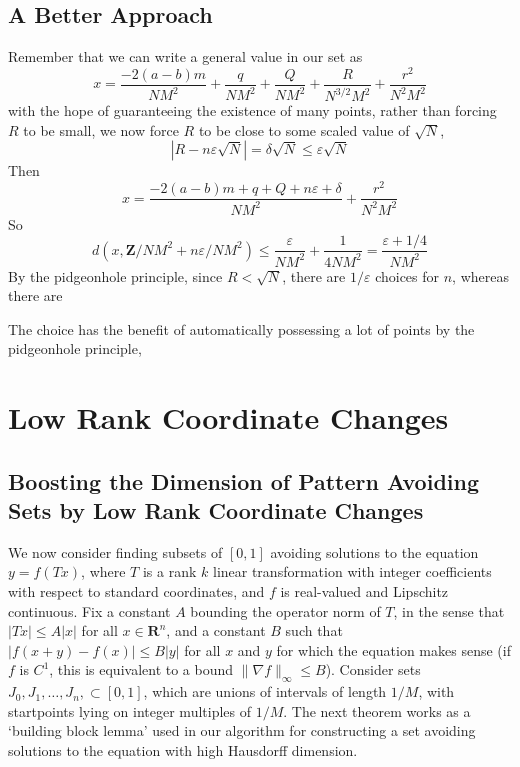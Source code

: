 \documentclass{report}
\theoremstyle{plain}
\theoremstyle{plain}
\begin{document}
\section{A Better Approach}

Remember that we can write a general value in our set as
%
\[ x = \frac{-2(a-b)m}{NM^2} + \frac{q}{NM^2} + \frac{Q}{NM^2} + \frac{R}{N^{3/2} M^2} + \frac{r^2}{N^2M^2} \]
%
with the hope of guaranteeing the existence of many points, rather than forcing $R$ to be small, we now force $R$ to be close to some scaled value of $\sqrt{N}$, 
%
\[ |R - n \varepsilon \sqrt{N}| = \delta \sqrt{N} \leq \varepsilon \sqrt{N} \]
%
Then
%
\[ x = \frac{-2(a-b)m + q + Q + n\varepsilon + \delta}{NM^2} + \frac{r^2}{N^2M^2} \]
%
So
%
\[ d \left( x, \mathbf{Z}/NM^2 + n\varepsilon / NM^2 \right) \leq \frac{\varepsilon}{NM^2} + \frac{1}{4NM^2} = \frac{\varepsilon + 1/4}{NM^2} \]
%
By the pidgeonhole principle, since $R < \sqrt{N}$, there are $1/\varepsilon$ choices for $n$, whereas there are


The choice has the benefit of automatically possessing a lot of points by the pidgeonhole principle,

\chapter{Low Rank Coordinate Changes}

\section{Boosting the Dimension of Pattern Avoiding Sets by Low Rank Coordinate Changes}

We now consider finding subsets of $[0,1]$ avoiding solutions to the equation $y = f(Tx)$, where $T$ is a rank $k$ linear transformation with integer coefficients with respect to standard coordinates, and $f$ is real-valued and Lipschitz continuous. Fix a constant $A$ bounding the operator norm of $T$, in the sense that $|Tx| \leq A|x|$ for all $x \in \mathbf{R}^n$, and a constant $B$ such that $|f(x+y) - f(x)| \leq B|y|$ for all $x$ and $y$ for which the equation makes sense (if $f$ is $C^1$, this is equivalent to a bound $\| \nabla f \|_\infty \leq B$). Consider sets $J_0, J_1, \dots, J_n, \subset [0,1]$, which are unions of intervals of length $1/M$, with startpoints lying on integer multiples of $1/M$. The next theorem works as a `building block lemma' used in our algorithm for constructing a set avoiding solutions to the equation with high Hausdorff dimension.
\end{document}
